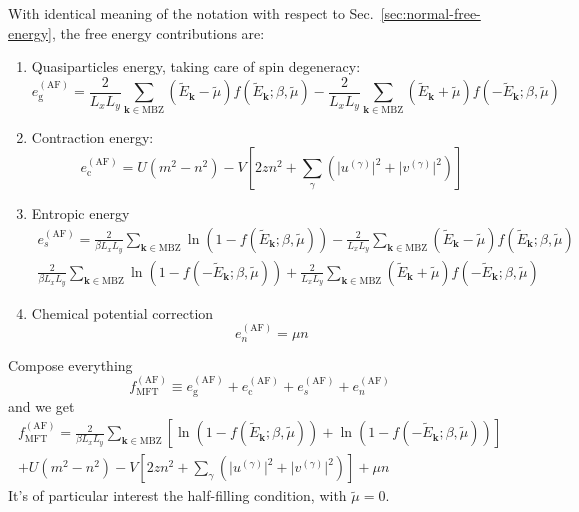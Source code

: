 With identical meaning of the notation with respect to Sec.~\ref{sec:normal-free-energy}, the free energy contributions are:
\begin{enumerate}
	\item Quasiparticles energy, taking care of spin degeneracy:
	\[
		e_\mathrm{g}^{(\mathrm{AF})} = \frac{2}{L_x L_y} \sum_{\mathbf{k} \in \mathrm{MBZ}} (\tilde{E}_\mathbf{k} - \tilde{\mu}) f( \tilde{E}_\mathbf{k}; \beta,\tilde{\mu}) - \frac{2}{L_x L_y} \sum_{\mathbf{k} \in \mathrm{MBZ}} (\tilde{E}_\mathbf{k} + \tilde{\mu}) f( -\tilde{E}_\mathbf{k}; \beta,\tilde{\mu})
	\]
	\item Contraction energy:
	\[
		e_\mathrm{c}^{(\mathrm{AF})} = U(m^2 - n^2) - V \left[
			2zn^2 + \sum_{\gamma} \left(
				\big|u^{(\gamma)}\big|^2 + \big|v^{(\gamma)}\big|^2
			\right)
		\right]
	\]
	\item Entropic energy
	\begin{multline*}
		e_s^{(\mathrm{AF})} = \frac{2}{\beta L_x L_y} \sum_{\mathbf{k}\in\mathrm{MBZ}} \ln \left(
		1- f( \tilde{E}_\mathbf{k}; \beta,\tilde{\mu}) \right) - \frac{2}{L_x L_y} \sum_{\mathbf{k}\in\mathrm{MBZ}} (\tilde{E}_\mathbf{k}-\tilde{\mu}) f( \tilde{E}_\mathbf{k}; \beta,\tilde{\mu}) \\
		\frac{2}{\beta L_x L_y} \sum_{\mathbf{k}\in\mathrm{MBZ}} \ln \left(
		1- f( -\tilde{E}_\mathbf{k}; \beta,\tilde{\mu}) \right) + \frac{2}{L_x L_y} \sum_{\mathbf{k}\in\mathrm{MBZ}} (\tilde{E}_\mathbf{k}+\tilde{\mu}) f( -\tilde{E}_\mathbf{k}; \beta,\tilde{\mu})
	\end{multline*}
	\item Chemical potential correction
	\[
		e_n^{(\mathrm{AF})} = \mu n
	\]
\end{enumerate}
Compose everything
\[
	f_\mathrm{MFT}^{(\mathrm{AF})} \equiv e_\mathrm{g}^{(\mathrm{AF})} + e_\mathrm{c}^{(\mathrm{AF})} + e_s^{(\mathrm{AF})} + e_n^{(\mathrm{AF})}
\]
and we get
\begin{multline}
	f_\mathrm{MFT}^{(\mathrm{AF})} = \frac{2}{\beta L_x L_y} \sum_{\mathbf{k}\in\mathrm{MBZ}} \left[
		\ln \left(
		1- f( \tilde{E}_\mathbf{k}; \beta,\tilde{\mu}) \right) + \ln \left(
		1- f( -\tilde{E}_\mathbf{k}; \beta,\tilde{\mu}) \right)
	\right] \\
	+ U(m^2 - n^2) - V \left[
		2zn^2 + \sum_{\gamma} \left(
			\big|u^{(\gamma)}\big|^2 + \big|v^{(\gamma)}\big|^2
		\right)
	\right] + \mu n
\end{multline}
It's of particular interest the half-filling condition, with $\tilde{\mu}=0$. \todo

